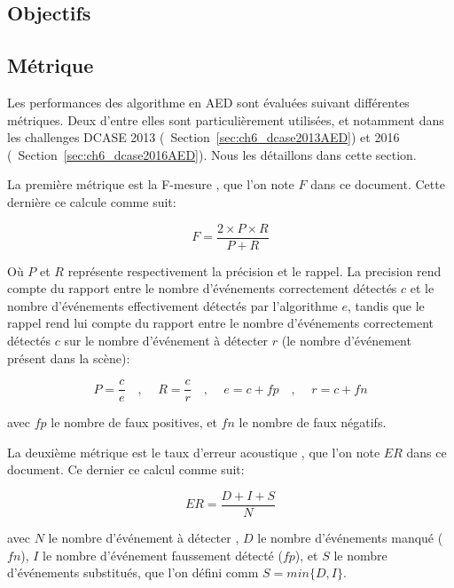 \subsection{Objectifs}
\label{sec:ch6_objAED}


\subsection{Métrique}
\label{sec:ch6_metriqueAED}

Les performances des algorithme en AED sont évaluées suivant différentes métriques. Deux d'entre elles sont particulièrement utilisées, et notamment dans les challenges DCASE 2013 (\cf~Section~\ref{sec:ch6_dcase2013AED}) et 2016 (\cf~Section~\ref{sec:ch6_dcase2016AED}). Nous les détaillons dans cette section.

La première métrique est la F-mesure \citep{Giannoulis:2013a,Stowell15}, que l'on note $F$ dans ce document. Cette dernière ce calcule comme suit:

\begin{equation}
F=\dfrac{2\times P \times R}{P+R}
\end{equation}

Où $P$ et $R$ représente respectivement la précision et le rappel. La precision rend compte du rapport entre le nombre d'événements correctement détectés $c$ et le nombre d'événements effectivement détectés par l'algorithme $e$, tandis que le rappel rend lui compte du rapport entre le nombre d'événements correctement détectés $c$ sur le nombre d'événement à détecter $r$ (le nombre d'événement présent dans la scène):

\begin{equation}
P=\dfrac{c}{e}  \quad \textrm{, } \quad R=\dfrac{c}{r} \quad \textrm{, } \quad  e=c+fp \quad \textrm{, } \quad  r=c+fn
\end{equation}

avec $fp$ le nombre de faux positives, et $fn$ le nombre de faux négatifs.


La deuxième métrique est le taux d'erreur acoustique \citep{poliner2007discriminative,clear}, que l'on note $ER$ dans ce document. Ce dernier ce calcul comme suit:

\begin{equation}
ER=\dfrac{D+I+S}{N}
\end{equation}

avec $N$ le nombre d'événement à détecter , $D$ le nombre d'événements manqué ($fn$), $I$ le nombre d'événement faussement détecté ($fp$), et $S$ le nombre d'événements substitués, que l'on défini comm $S=min\lbrace D,I\rbrace$.

